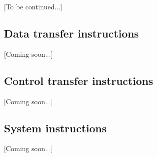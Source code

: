 \begin{multicols}{2}
\begin{itemize}











            \end{itemize}

        \end{multicols}

        [To be continued...]

    \subsection{Data transfer instructions}

        [Coming soon...]

    \subsection{Control transfer instructions}

        [Coming soon...]

    \subsection{System instructions}

        [Coming soon...]